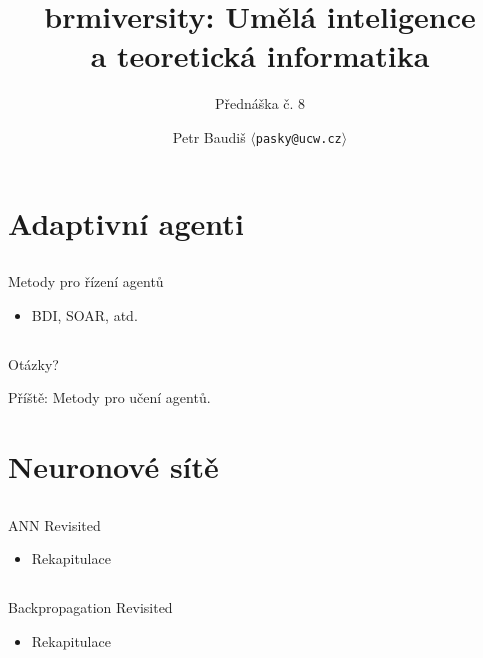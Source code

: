 \documentclass{beamer}
\begin{document}

\title{brmiversity: Umělá inteligence \\ a teoretická informatika}
\subtitle{Přednáška č. 8}
\author{Petr Baudiš $\langle${\tt pasky@ucw.cz}$\rangle$}
\date{}
\frame{\titlepage}

\section{Adaptivní agenti}

\subsection{}
\begin{frame}{Metody pro řízení agentů}
\begin{itemize}
\item BDI, SOAR, atd.
\end{itemize}
\end{frame}

\subsection{}
\begin{frame}{Otázky?}
\begin{center}
Příště: Metody pro učení agentů.
\end{center}
\end{frame}

\section{Neuronové sítě}

\subsection{}
\begin{frame}{ANN Revisited}
\begin{itemize}
\item Rekapitulace
\end{itemize}
\end{frame}

\subsection{}
\begin{frame}{Backpropagation Revisited}
\begin{itemize}
\item Rekapitulace
\end{itemize}
\end{frame}
\end{document}
